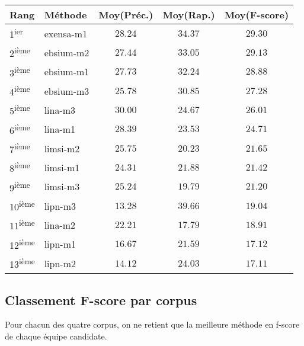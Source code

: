 \documentclass[10pt,twoside]{article}
\newcommand{\fscore}{f-score}
\begin{document}
\begin{center}
\large
\begin{tabular}{l | l | c c c}
Rang & Méthode & Moy(Préc.) & Moy(Rap.) & \textbf{Moy(F-score)} \\
\hline
\hline
1\textsuperscript{ier} & exensa-m1 & $28.24$  &  $34.37$  &  $\mathbf{29.30}$ \\
2\textsuperscript{ième} & ebsium-m2 & $27.44$  &  $33.05$  &  $\mathbf{29.13}$ \\
3\textsuperscript{ième} & ebsium-m1 & $27.73$  &  $32.24$  &  $\mathbf{28.88}$ \\
4\textsuperscript{ième} & ebsium-m3 & $25.78$  &  $30.85$  &  $\mathbf{27.28}$ \\
5\textsuperscript{ième} & lina-m3 & $30.00$  &  $24.67$  &  $\mathbf{26.01}$ \\
6\textsuperscript{ième} & lina-m1 & $28.39$  &  $23.53$  &  $\mathbf{24.71}$ \\
7\textsuperscript{ième} & limsi-m2 & $25.75$  &  $20.23$  &  $\mathbf{21.65}$ \\
8\textsuperscript{ième} & limsi-m1 & $24.31$  &  $21.88$  &  $\mathbf{21.42}$ \\
9\textsuperscript{ième} & limsi-m3 & $25.24$  &  $19.79$  &  $\mathbf{21.20}$ \\
10\textsuperscript{ième} & lipn-m3 & $13.28$  &  $39.66$  &  $\mathbf{19.04}$ \\
11\textsuperscript{ième} & lina-m2 & $22.21$  &  $17.79$  &  $\mathbf{18.91}$ \\
12\textsuperscript{ième} & lipn-m1 & $16.67$  &  $21.59$  &  $\mathbf{17.12}$ \\
13\textsuperscript{ième} & lipn-m2 & $14.12$  &  $24.03$  &  $\mathbf{17.11}$ \\
\end{tabular}
\end{center}

    
\subsection{Classement F-score par corpus}
\label{sec:fscore}

Pour chacun des quatre corpus, on ne retient que la meilleure méthode en \fscore{} de chaque équipe candidate.
\end{document}
